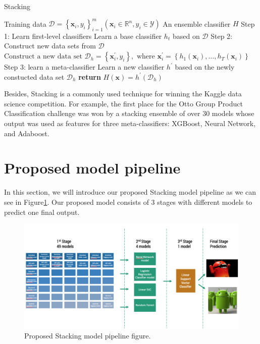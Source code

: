 \begin{algorithm}[htbp]
    \centering
    \caption{Stacking}
    \label{alg:algo1}
    \begin{algorithmic}[1]  
    \renewcommand{\algorithmicrequire}{\textbf{Input:}}
    \renewcommand{\algorithmicensure}{\textbf{Output:}}
    \Require Training data $\mathcal{D}=\left\{\mathbf{x}_{i}, y_{i}\right\}_{i=1}^{m}\left(\mathbf{x}_{i} \in \mathbb{R}^{n}, y_{i} \in \mathcal{Y}\right)$
    \Ensure An ensemble classifier $H$
    \State Step 1: Learn first-level classifiers
        \Statex Learn a base classifier $h_{t}$ based on $\mathcal{D}$
    \EndFor
    \State Step 2: Construct new data sets from $\mathcal{D}$
    \State $\text{Construct a new data set }\mathcal{D}_{h}=\left\{\mathbf{x}_{i}^{\prime}, y_{i}\right\}, \text { where } \mathbf{x}_{i}^{\prime}=\left\{h_{1}\left(\mathbf{x}_{i}\right), \ldots, h_{T}\left(\mathbf{x}_{i}\right)\right\}$
    \EndFor
    \State Step 3: learn a meta-classifier
    \State Learn a new classifier $h^{\prime}$ based on the newly constucted data set $\mathcal{D}_h$
    \State \textbf{return} $H(\mathbf{x})=h^{\prime}\left(\mathcal{D}_h\right)$
    \end{algorithmic}
\end{algorithm}

Besides, Stacking is a commonly used technique for winning the Kaggle data science competition. For example, the first place for the Otto Group Product Classification challenge was won by a stacking ensemble of over 30 models whose output was used as features for three meta-classifiers: XGBoost, Neural Network, and Adaboost.

\section{Proposed model pipeline} \label{model}

In this section, we will introduce our proposed Stacking model pipeline as we can see in Figure\ref{fig:modelpipeline}. Our proposed model consists of 3 stages with different models to predict one final output.

\begin{figure}[htbp]
    \centering
    \includegraphics[width=\textwidth]{./Figure/modelpipeline.png}
    \caption{Proposed Stacking model pipeline figure.}
    \label{fig:modelpipeline}
\end{figure}

